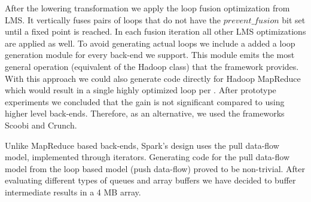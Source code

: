 After the lowering transformation we apply the loop fusion optimization from LMS. It vertically fuses pairs of loops that do not have the $prevent\_fusion$ bit set until a fixed point is reached. In each fusion iteration all other LMS optimizations are applied as well. To avoid generating actual  loops we include a added a loop generation module for every back-end we support. This module emits the most general operation (equivalent of the Hadoop  class) that the framework provides. With this approach we could also generate code directly for Hadoop MapReduce which would result in a single highly optimized loop per . After prototype experiments we concluded that the gain is not significant compared to using higher level back-ends. Therefore, as an alternative, we used the frameworks Scoobi and Crunch.

Unlike MapReduce based back-ends, Spark's design uses the pull data-flow model, implemented through iterators. Generating code for the pull data-flow model from the loop based model (push data-flow) proved to be non-trivial. After evaluating different types of queues and array buffers we have decided to buffer intermediate results in a 4 MB array.